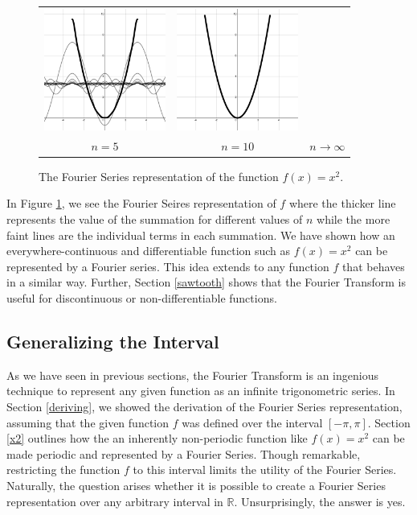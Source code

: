 \documentclass[11pt]{amsart}
\theoremstyle{plain}
\theoremstyle{definition}
\newcommand{\R}{\mathbb R}
\begin{document}
\begin{figure}[ht!]
\begin{tabular}{ccc}
  \includegraphics[width=40mm]{Images/simple_10.png} &
  \includegraphics[width=40mm]{Images/simple_full.png} \\
  $n=5$ & $n=10$ & $n\to\infty$\\[6pt]
\end{tabular}
\caption{\centering The Fourier Series representation of the function $f(x)=x^2$.}
\label{fig:simple}
\end{figure}

In Figure \ref{fig:simple}, we see the Fourier Seires representation of $f$ where the thicker line represents the value of the summation for different values of $n$ while the more faint lines are the individual terms in each summation. We have shown how an everywhere-continuous and differentiable function such as $f(x)=x^2$ can be represented by a Fourier series. This idea extends to any function $f$ that behaves in a similar way. Further, Section \ref{sawtooth} shows that the Fourier Transform is useful for discontinuous or non-differentiable functions.

\subsection{Generalizing the Interval}\label{bounds}
    As we have seen in previous sections, the Fourier Transform is an ingenious technique to represent any given function as an infinite trigonometric series. In Section \ref{deriving}, we showed the derivation of the Fourier Series representation, assuming that the given function $f$ was defined over the interval $[-\pi,\pi]$. Section \ref{x2} outlines how the an inherently non-periodic function like $f(x) = x^2$ can be made periodic and represented by a Fourier Series. Though remarkable, restricting the function $f$ to this interval limits the utility of the Fourier Series. Naturally, the question arises whether it is possible to create a Fourier Series representation over any arbitrary interval in $\R$. Unsurprisingly, the answer is yes.  
\end{document}
